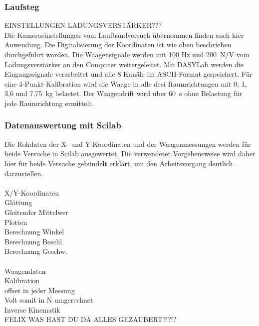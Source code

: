 \subsubsection{Laufsteg}
EINSTELLUNGEN LADUNGSVERSTÄRKER???\\
Die Kameraeinstellungen vom Laufbandversuch übernommen finden auch hier Anwendung. Die Digitalisierung der Koordinaten ist wie oben beschrieben durchgeführt worden. Die Waagensignale werden mit 100 Hz und 200~N/V vom Ladungsverstärker an den Computer weitergeleitet. Mit DASYLab werden die Eingangssignale verarbeitet und alle 8 Kanäle im ASCII-Format gespeichert.
Für eine 4-Punkt-Kalibration wird die Waage in alle drei Raumrichtungen mit 0, 1, 3,6 und 7,75~kg belastet. Der Waagendrift wird über 60~s ohne Belastung für jede Raumrichtung ermittelt. 


\subsubsection{Datenauswertung mit Scilab}
Die Rohdaten der X- und Y-Koordinaten und der Waagenmessungen werden für beide Versuche in Scilab ausgewertet. Die verwendetet Vorgehensweise wird daher hier für beide Versuche gebündelt erklärt, um den Arbeitsvorgang deutlich darzustellen.\\\\
X/Y-Koordinaten\\
Glättung\\
Gleitender Mittelwer\\
Plotten\\
Berechnung Winkel\\
Berechnung Beschl.\\
Berechnung Geschw.\\
\\
Waagendaten\\
Kalibration\\
offset in jeder Messung\\
Volt somit in N umgerechnet\\

Inverse Kinematik\\
FELIX WAS HAST DU DA ALLES GEZAUBERT?!?!?


